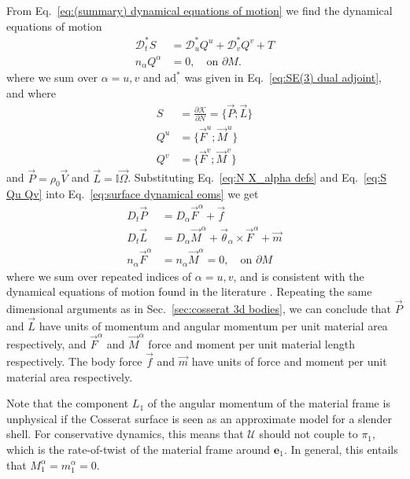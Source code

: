From Eq.~\ref{eq:(summary) dynamical equations of motion} we find the dynamical equations of motion
\begin{subequations}  \label{eq:surface dynamical eoms}
\begin{align}
\mathcal{D}_t^* S & = \mathcal{D}_u^* Q^u + \mathcal{D}_v^* Q^v + T \\
n_\alpha Q^\alpha & = 0, \quad \text{on } \partial M.
\end{align}
\end{subequations}
where we sum over $\alpha = u,v$ and $\text{ad}_{\cdot}^*$ was given in Eq.~\ref{eq:SE(3) dual adjoint}, and where
\begin{subequations} \label{eq:S Qu Qv}
\begin{align}
S & = \frac{\partial \mathcal{K}}{\partial N} = \{ \vec{P} ; \vec{L} \} \\
Q^u & = \{ \vec{F}^u ; \vec{M}^u \} \\
Q^v & = \{ \vec{F}^v ; \vec{M}^v \}
\end{align}
\end{subequations}
and $\vec{P} = \rho_0 \vec{V}$ and $\vec{L} = \mathbb{I} \vec{\Omega}$.  Substituting Eq.~\ref{eq:N X_alpha defs} and Eq.~\ref{eq:S Qu Qv} into Eq.~\ref{eq:surface dynamical eoms} we get
\begin{subequations} \label{eq:cosserat surface dynamic eoms}
\begin{align}
D_t \vec{P} & = D_\alpha \vec{F}^\alpha + \vec{f} \label{eq:surface P eom} \\
D_t \vec{L} & = D_\alpha \vec{M}^\alpha + \vec{\theta}_\alpha \times \vec{F}^\alpha + \vec{m} \label{eq:surface L eom} \\
n_\alpha \vec{F}^\alpha & = n_\alpha \vec{M}^\alpha = 0, \quad \text{on } \partial M 
\end{align}
\end{subequations}
where we sum over repeated indices of $\alpha = u, v$, and is consistent with the dynamical equations of motion found in the literature \citep{altenbachCosseratMedia2013}. Repeating the same dimensional arguments as in Sec.~\ref{sec:cosserat 3d bodies}, we can conclude that $\vec{P}$ and $\vec{L}$ have units of momentum and angular momentum per unit material area respectively, and $\vec{F}^\alpha$ and $\vec{M}^\alpha$ force and moment per unit material length respectively. The body force $\vec{f}$ and $\vec{m}$ have units of force and moment per unit material area respectively.

Note that the component $L_1$ of the angular momentum of the material frame is unphysical if the Cosserat surface is seen as an approximate model for a slender shell. For conservative dynamics, this means that $\mathcal{U}$ should not couple to $\pi_1$, which is the rate-of-twist of the material frame around $\mathbf{e}_1$. In general, this entails that $M^\alpha_1 = m^\alpha_1 = 0$.

